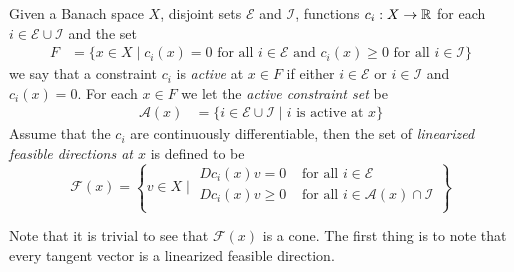 \begin{defn}Given a Banach space $X$, disjoint sets $\mathcal{E}$ and
  $\mathcal{I}$, functions $c_i : X \to \mathbb{R}$ for each $i \in
  \mathcal{E} \cup \mathcal{I}$ and the set
\begin{align*}
F &= \lbrace x \in X \mid c_i(x) = 0 \text{ for all $i \in
    \mathcal{E}$ and } c_i(x) \geq 0 \text{ for all $i \in
    \mathcal{I}$} \rbrace
\end{align*}
we say that a constraint $c_i$ is \emph{active} at $x \in F$ if either
$i \in \mathcal{E}$ or $i \in \mathcal{I}$ and $c_i(x) = 0$.  For each
$x \in F$ we let the \emph{active constraint set} be 
\begin{align*}
\mathcal{A}(x) &= \lbrace i \in \mathcal{E} \cup \mathcal{I} \mid i
                 \text{ is active at $x$} \rbrace
\end{align*}
Assume that the $c_i$ are continuously differentiable, then the set of \emph{linearized feasible directions at $x$} is defined to
be 
\begin{equation*}
\mathcal{F}(x) =
\left \{ v \in X \mid
\begin{aligned}
Dc_i(x) v = 0 & \text{ for all $i \in \mathcal{E}$} \\
Dc_i(x) v \geq 0 & \text{ for all $i \in \mathcal{A}(x) \cap \mathcal{I}$} \\
\end{aligned}
\right \}
\end{equation*}
\end{defn}
Note that it is trivial to see that $\mathcal{F}(x)$ is a cone.  The
first thing is to note that every tangent vector is a linearized
feasible direction.


